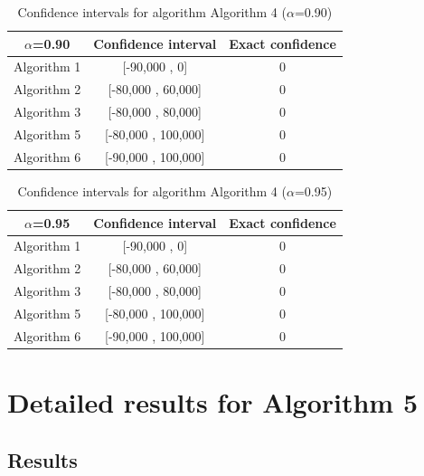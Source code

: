 \documentclass[a4paper,10pt]{article}
\begin{document}
\begin{table}[!htp]
\centering\small
\begin{tabular}{
|c|c|c|}
\hline
 $\alpha$=0.90 & Confidence interval & Exact confidence \\ \hline 
Algorithm 1 & [-90,000 , 0] & 0\\ \hline 
Algorithm 2 & [-80,000 , 60,000] & 0\\ \hline 
Algorithm 3 & [-80,000 , 80,000] & 0\\ \hline 
Algorithm 5 & [-80,000 , 100,000] & 0\\ \hline 
Algorithm 6 & [-90,000 , 100,000] & 0\\ \hline 

\end{tabular}
\caption{Confidence intervals for algorithm Algorithm 4 ($\alpha$=0.90)}
\end{table}
\begin{table}[!htp]
\centering\small
\begin{tabular}{
|c|c|c|}
\hline
 $\alpha$=0.95 & Confidence interval & Exact confidence \\ \hline 
Algorithm 1 & [-90,000 , 0] & 0\\ \hline 
Algorithm 2 & [-80,000 , 60,000] & 0\\ \hline 
Algorithm 3 & [-80,000 , 80,000] & 0\\ \hline 
Algorithm 5 & [-80,000 , 100,000] & 0\\ \hline 
Algorithm 6 & [-90,000 , 100,000] & 0\\ \hline 

\end{tabular}
\caption{Confidence intervals for algorithm Algorithm 4 ($\alpha$=0.95)}
\end{table}

 \clearpage 


\section{Detailed results for Algorithm 5}


\subsection{Results}
\end{document}
